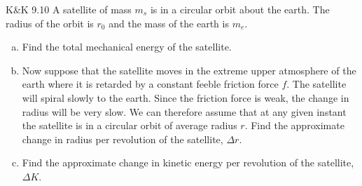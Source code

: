 \documentclass{esg8012pset}
\begin{document}
\begin{problem}{K\&K 9.10}
  A satellite of mass $m_s$ is in a circular orbit about the earth. The radius of the orbit is $r_0$ and the mass of the earth is $m_e$.
  \begin{enumerate}[(a)]
    \item Find the total mechanical energy of the satellite.
    \item Now suppose that the satellite moves in the extreme upper atmosphere of the earth where it is retarded by a constant feeble friction force $f$. The satellite will spiral slowly to the earth. Since the friction force is weak, the change in radius will be very slow. We can therefore assume that at any given instant the satellite is in a circular orbit of average radius $r$. Find the approximate change in radius per revolution of the satellite, $\Delta r$.
    \item Find the approximate change in kinetic energy per revolution of the satellite, $\Delta K$.
  \end{enumerate}
\end{problem}
\end{document}
